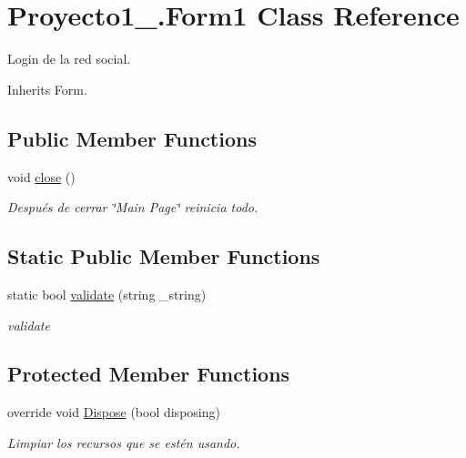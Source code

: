 \hypertarget{class_proyecto1__1096917_1_1_form1}{}\section{Proyecto1\+\_.\+Form1 Class Reference}
\label{class_proyecto1__1096917_1_1_form1}


Login de la red social.  




Inherits Form.

\subsection*{Public Member Functions}
\begin{DoxyCompactItemize}
\item 
void \mbox{\hyperlink{class_proyecto1__1096917_1_1_form1_a0bdf3e74bcdc4dbc9dd959f791668d42}{close}} ()
\begin{DoxyCompactList}\small\item\em Después de cerrar \char`\"{}\+Main Page\char`\"{} reinicia todo. \end{DoxyCompactList}\end{DoxyCompactItemize}
\subsection*{Static Public Member Functions}
\begin{DoxyCompactItemize}
\item 
static bool \mbox{\hyperlink{class_proyecto1__1096917_1_1_form1_a2c873349728e55828bbf9f2f1d3e2498}{validate}} (string \+\_\+string)
\begin{DoxyCompactList}\small\item\em validate \end{DoxyCompactList}\end{DoxyCompactItemize}
\subsection*{Protected Member Functions}
\begin{DoxyCompactItemize}
\item 
override void \mbox{\hyperlink{class_proyecto1__1096917_1_1_form1_acc2460d7f1237443a701fe741cbc183d}{Dispose}} (bool disposing)
\begin{DoxyCompactList}\small\item\em Limpiar los recursos que se estén usando. \end{DoxyCompactList}\end{DoxyCompactItemize}



